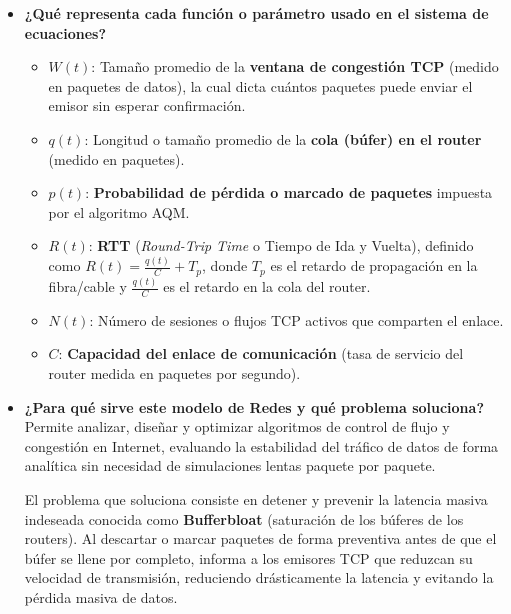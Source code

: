 \begin{enumerate}[label=\arabic*., leftmargin=*]
\begin{itemize}[leftmargin=*]
        \item \textbf{¿Qué representa cada función o parámetro usado en el sistema de ecuaciones?}
        \begin{itemize}[leftmargin=*]
            \item $W(t)$: Tamaño promedio de la \textbf{ventana de congestión TCP} (medido en paquetes de datos), la cual dicta cuántos paquetes puede enviar el emisor sin esperar confirmación.
            \item $q(t)$: Longitud o tamaño promedio de la \textbf{cola (búfer) en el router} (medido en paquetes).
            \item $p(t)$: \textbf{Probabilidad de pérdida o marcado de paquetes} impuesta por el algoritmo AQM.
            \item $R(t)$: \textbf{RTT} (\textit{Round-Trip Time} o Tiempo de Ida y Vuelta), definido como $R(t) = \frac{q(t)}{C} + T_p$, donde $T_p$ es el retardo de propagación en la fibra/cable y $\frac{q(t)}{C}$ es el retardo en la cola del router.
            \item $N(t)$: Número de sesiones o flujos TCP activos que comparten el enlace.
            \item $C$: \textbf{Capacidad del enlace de comunicación} (tasa de servicio del router medida en paquetes por segundo).
        \end{itemize}

        \item \textbf{¿Para qué sirve este modelo de Redes y qué problema soluciona?}\\
        Permite analizar, diseñar y optimizar algoritmos de control de flujo y congestión en Internet, evaluando la estabilidad del tráfico de datos de forma analítica sin necesidad de simulaciones lentas paquete por paquete. 
        
        El problema que soluciona consiste en detener y prevenir la latencia masiva indeseada conocida como \textbf{Bufferbloat} (saturación de los búferes de los routers). Al descartar o marcar paquetes de forma preventiva antes de que el búfer se llene por completo, informa a los emisores TCP que reduzcan su velocidad de transmisión, reduciendo drásticamente la latencia y evitando la pérdida masiva de datos.
    \end{itemize}
\end{enumerate}